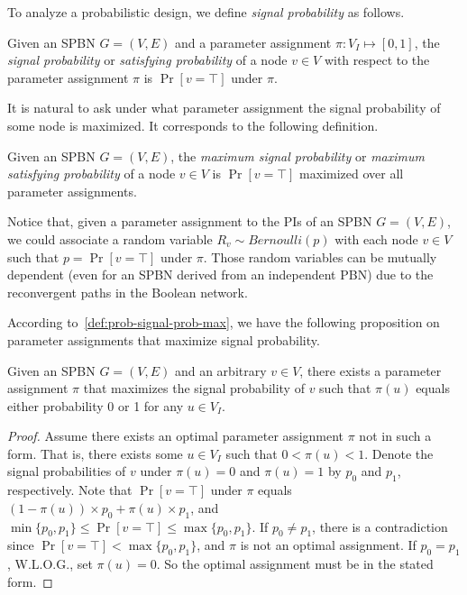 To analyze a probabilistic design,
we define \textit{signal probability} as follows.
\begin{definition}
    \label{def:prob-signal-prob}
    Given an SPBN $G=(V,E)$ and a parameter assignment $\pi:V_I\mapsto[0,1]$,
    the \textit{signal probability} or \textit{satisfying probability} of a node $v \in V$
    with respect to the parameter assignment $\pi$ is $\Pr[v=\top]$ under $\pi$.
\end{definition}
It is natural to ask under what parameter assignment the signal probability of some node is maximized.
It corresponds to the following definition.
\begin{definition}
    \label{def:prob-signal-prob-max}
    Given an SPBN $G=(V,E)$,
    the \textit{maximum signal probability} or \textit{maximum satisfying probability} of a node
    $v\in V$ is $\Pr[v=\top]$ maximized over all parameter assignments.
\end{definition}

Notice that, given a parameter assignment to the PIs of an SPBN $G=(V,E)$,
we could associate a random variable $R_v\sim\textit{Bernoulli}(p)$ with each node $v \in V$
such that $p=\Pr[v=\top]$ under $\pi$.
Those random variables can be mutually dependent (even for an SPBN derived from an independent PBN)
due to the reconvergent paths in the Boolean network.

According to~\cref{def:prob-signal-prob-max},
we have the following proposition on parameter assignments that maximize signal probability.

\begin{proposition}
    Given an SPBN $G=(V,E)$ and an arbitrary $v \in V$,
    there exists a parameter assignment $\pi$ that maximizes the signal probability of $v$
    such that $\pi(u)$ equals either probability 0 or 1 for any $u \in V_I$.
\end{proposition}
\begin{proof}
    Assume there exists an optimal parameter assignment $\pi$ not in such a form.
    That is, there exists some $u \in V_I$ such that $0<\pi(u)<1$.
    Denote the signal probabilities of $v$ under $\pi(u)=0$ and $\pi(u)=1$ by $p_0$ and $p_1$, respectively.
    Note that $\Pr[v=\top]$ under $\pi$ equals $(1-\pi(u)) \times p_0 + \pi(u) \times p_1$,
    and $\min\{p_0,p_1\}\leq\Pr[v=\top]\leq\max\{p_0,p_1\}$.
    If $p_0 \neq p_1$,
    there is a contradiction since $\Pr[v=\top]<\max\{p_0,p_1\}$,
    and $\pi$ is not an optimal assignment.
    If $p_0=p_1$, W.L.O.G., set $\pi(u)=0$.
    So the optimal assignment must be in the stated form.
\end{proof}

